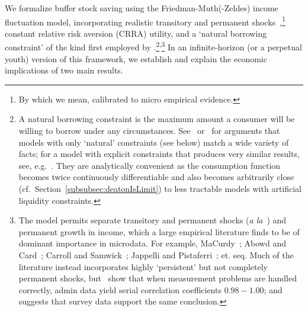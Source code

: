 \documentclass[BufferStockTheory]{subfiles}
\begin{document}
We formalize buffer stock saving using the Friedman-Muth(-Zeldes) income fluctuation model, incorporating realistic transitory and permanent shocks~\citep{friedmanATheory, muthOptimal, zeldesStochastic},\footnote{By which we mean, calibrated to micro empirical evidence.}  constant relative risk aversion (CRRA) utility, and a `natural borrowing constraint' of the kind first employed by \cite{zeldesStochastic}.\footnote{A natural borrowing constraint is the maximum amount a consumer will be willing to borrow under any circumstances.
See~\cite{carrollBSLCPIH} or~\cite{gpLifeCycle} for arguments that models with only `natural' constraints (see below) match a wide variety of facts; for a model with explicit constraints that produces very similar results, see, e.g.~\cite{Cagetti}.
They are analytically convenient as the consumption function becomes twice continuously differentiable and also becomes arbitrarily close (cf.\ Section~\ref{subsubsec:deatonIsLimit}) to less tractable models with artificial liquidity constraints.}\textsuperscript{,}\footnote{The model permits separate transitory and permanent shocks (\textit{a la}~\cite{muthOptimal}) and permanent growth in income, which a large empirical literature finds to be of dominant importance in microdata.
For example, MaCurdy~\citeyearpar{macurdyTimeseries}; Abowd and Card~\citeyearpar{acCovariance}; Carroll and Samwick~\citeyearpar{csNature}; Jappelli and Pistaferri~\citeyear{jpCins}; et.
seq.
Much of the literature instead incorporates highly `persistent' but not completely permanent shocks, but~\cite{dhmImproving} show that when measurement problems are handled correctly, admin data yield serial correlation coefficients $0.98-1.00$; and~\cite{dmHowMuch} suggests that survey data support the same conclusion.}  In an infinite-horizon (or a \cite{blanchardFinite} perpetual youth) version of this framework, we establish and explain the economic implications of two main results.
\end{document}

